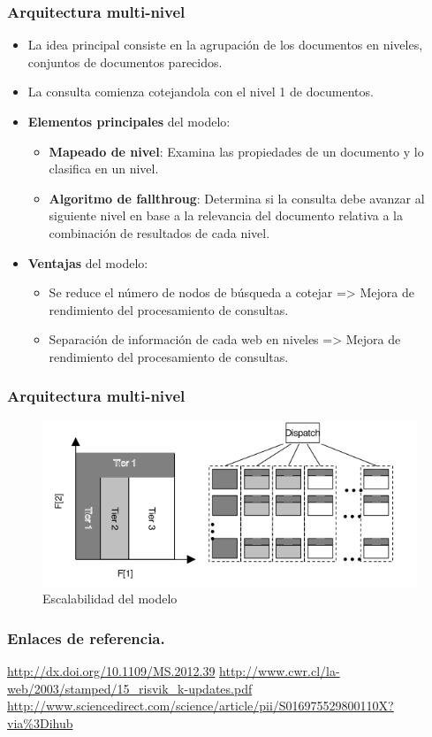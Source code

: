 \documentclass[9pt]{beamer} %
\begin{document}
\begin{frame}
	\frametitle{Arquitectura multi-nivel}
	\begin{itemize}
		\item La idea principal consiste en la agrupación de los documentos en niveles, conjuntos de documentos parecidos.
		\item La consulta comienza cotejandola con el nivel 1 de documentos.
		\item \textbf{Elementos principales} del modelo:
			\begin{itemize}
				\item \textbf{Mapeado de nivel}: Examina las propiedades de un documento y lo clasifica en un nivel.
				\item \textbf{Algoritmo de fallthroug}: Determina si la consulta debe avanzar al siguiente nivel en base a la relevancia del documento relativa a la combinación de resultados de cada nivel.
			\end{itemize}
		\item \textbf{Ventajas} del modelo:
			\begin{itemize}
				\item Se reduce el número de nodos de búsqueda a cotejar => Mejora de rendimiento del procesamiento de consultas.
				\item Separación de información de cada web en niveles => Mejora de rendimiento del procesamiento de consultas.
			\end{itemize}
	\end{itemize}
\end{frame}
	\begin{frame}
		\frametitle{Arquitectura multi-nivel}
		\begin{figure}[H]
				\centering
				\includegraphics[scale=0.75]{./img/multitier2.png}
				\caption{Escalabilidad del modelo}
				\label{fig:my_label}
		\end{figure}
\end{frame}

\begin{frame}
	\frametitle{Enlaces de referencia.}
	\begin{thebibliography}{9}
		\url{http://dx.doi.org/10.1109/MS.2012.39}
		\url{http://www.cwr.cl/la-web/2003/stamped/15_risvik_k-updates.pdf}
		\url{http://www.sciencedirect.com/science/article/pii/S016975529800110X?via\%3Dihub}

	\end{thebibliography}
\end{frame}
\end{document}
